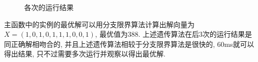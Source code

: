 \documentclass{article}
\begin{document}
\begin{homeworkProblem}
\begin{figure}[H]
{        }
        
        \caption{各次的运行结果}
        \label{fig:taizhous}
    \end{figure}
    主函数中的实例的最优解可以用分支限界算法计算出解向量为$X=(1,0,1,0,1,1,1,0,0,1)$, 最优值为388. 上述遗传算法在后3次的运行结果是同正确解相吻合的, 并且上述遗传算法相较于分支限界算法是很快的, 60ms就可以得出结果, 只不过需要多次运行并观察以得出最优解.
\end{homeworkProblem}
\end{document}
